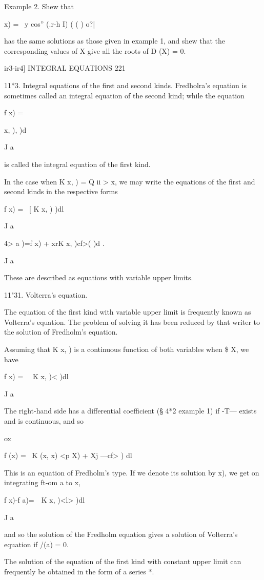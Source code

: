 Example 2. Shew that 

  x) = \ y cos'' (.r-h I) (  ( ) o?| 

has the same solutions as those given in example 1, and shew that the corresponding 
values of X give all the roots of D (X) = 0. 



ir3-ir4] INTEGRAL EQUATIONS 221 

11*3. Integral equations of the first and second kinds. 
Fredholra's equation is sometimes called an integral equation of the second 
kind; while the equation 

f x) = \ \  \ \  {x, ),   )d  

J a 

is called the integral equation of the first kind. 

In the case when K  x,  ) = Q ii   > x, we may write the equations of the 
first and second kinds in the respective forms 

f x) = \ [  K x, )   )dl 

J a 

4> a )=f x) + xrK x, )cf>( )d . 

J a 

These are described as equations with variable upper limits. 

11"31. Volterra's equation. 

The equation of the first kind with variable upper limit is frequently 
known as Volterra's equation. The problem of solving it has been reduced 
by that writer to the solution of Fredholm's equation. 

Assuming that K  x,  ) is a continuous function of both variables when 
  \$ X, we have 

f x) = \ \  K x, )<   )dl 

J a 

The right-hand side has a differential coefficient (§ 4*2 example 1) if 
-T— exists and is continuous, and so 

ox 

f (x) = \ K (x, x) <p  X) + Xj —cf>  ) dl 

This is an equation of Fredholm's type. If we denote its solution by 
 x), we get on integrating ft-om a to x, 

f x)-f a)=\ \   K x, )<l>  )dl 

J a 

and so the solution of the Fredholm equation gives a solution of Volterra's 
equation if /(a) = 0. 

The solution of the equation of the first kind with constant upper limit 
can frequently be obtained in the form of a series *. 

}
